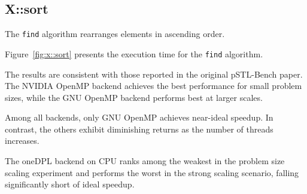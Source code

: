 \documentclass[sigconf]{acmart}
\begin{document}
\subsection{X::sort}
The \texttt{find} algorithm rearranges elements in ascending order.

Figure~\ref{fig:x::sort} presents the execution time for the \texttt{find}
algorithm.

The results are consistent with those reported in the original pSTL-Bench
paper. The NVIDIA OpenMP backend achieves the best performance for small
problem sizes, while the GNU OpenMP backend performs best at larger scales.

Among all backends, only GNU OpenMP achieves near-ideal speedup. In contrast,
the others exhibit diminishing returns as the number of threads increases.

The oneDPL backend on CPU ranks among the weakest in the problem size scaling
experiment and performs the worst in the strong scaling scenario, falling
significantly short of ideal speedup.
\end{document}
